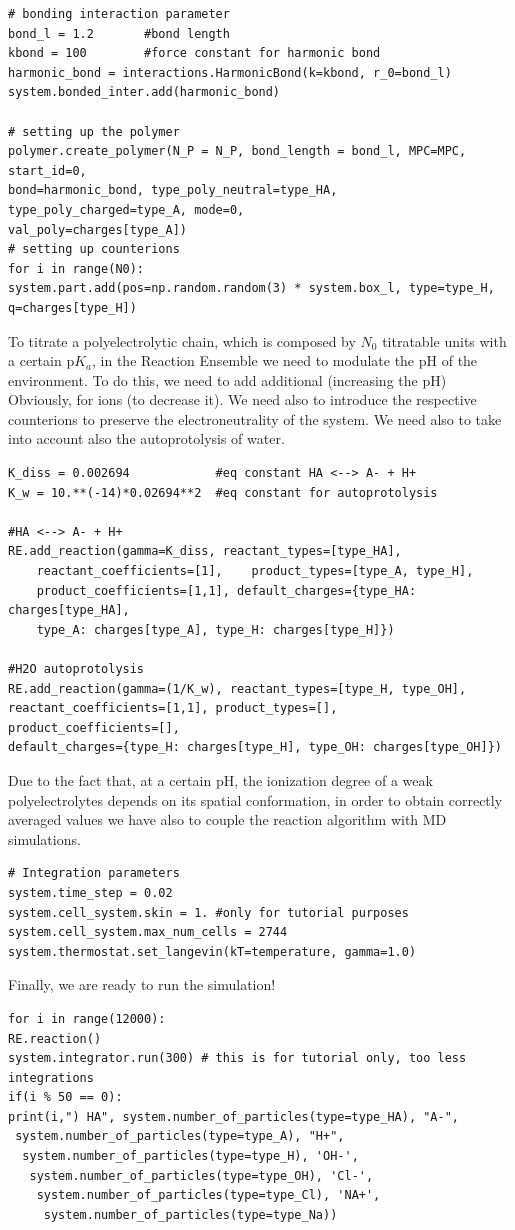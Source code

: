 \documentclass[
a4paper,                        %
11pt,                           %
twoside,                        %
footsepline,                    %
headsepline,                    %
headexclude,                    %
footexclude,                    %
pagesize,                       %
]{scrartcl}
\begin{document}
\begin{verbatim}
# bonding interaction parameter
bond_l = 1.2       #bond length
kbond = 100        #force constant for harmonic bond
harmonic_bond = interactions.HarmonicBond(k=kbond, r_0=bond_l)
system.bonded_inter.add(harmonic_bond)

# setting up the polymer
polymer.create_polymer(N_P = N_P, bond_length = bond_l, MPC=MPC, start_id=0, 
bond=harmonic_bond, type_poly_neutral=type_HA, type_poly_charged=type_A, mode=0,
val_poly=charges[type_A])
# setting up counterions
for i in range(N0):
system.part.add(pos=np.random.random(3) * system.box_l, type=type_H, q=charges[type_H])
\end{verbatim}

To titrate a polyelectrolytic chain, which is composed by $N_0$ titratable units with a certain $\text{p}K_a$, in the Reaction Ensemble we need to modulate the pH of the environment. To do this, we need to add additional  (increasing the pH) Obviously, for  ions (to decrease it). We need also to introduce the respective counterions to preserve the electroneutrality of the system. We need also to take into account also the autoprotolysis of water.

\begin{verbatim}
K_diss = 0.002694            #eq constant HA <--> A- + H+
K_w = 10.**(-14)*0.02694**2  #eq constant for autoprotolysis

#HA <--> A- + H+
RE.add_reaction(gamma=K_diss, reactant_types=[type_HA],
    reactant_coefficients=[1],    product_types=[type_A, type_H], 
    product_coefficients=[1,1], default_charges={type_HA: charges[type_HA], 
    type_A: charges[type_A], type_H: charges[type_H]})

#H2O autoprotolysis 
RE.add_reaction(gamma=(1/K_w), reactant_types=[type_H, type_OH], 
reactant_coefficients=[1,1], product_types=[],    product_coefficients=[],    
default_charges={type_H: charges[type_H], type_OH: charges[type_OH]})
\end{verbatim}

Due to the fact that, at a certain pH, the ionization degree of a weak polyelectrolytes depends on its spatial conformation, in order to obtain  correctly averaged values we have also to couple the reaction algorithm with MD simulations. 

\begin{verbatim}
# Integration parameters
system.time_step = 0.02
system.cell_system.skin = 1. #only for tutorial purposes 
system.cell_system.max_num_cells = 2744
system.thermostat.set_langevin(kT=temperature, gamma=1.0)
\end{verbatim}
Finally, we are ready to run the simulation!
\begin{verbatim}
for i in range(12000):
RE.reaction()
system.integrator.run(300) # this is for tutorial only, too less integrations
if(i % 50 == 0):
print(i,") HA", system.number_of_particles(type=type_HA), "A-",
 system.number_of_particles(type=type_A), "H+",
  system.number_of_particles(type=type_H), 'OH-',
   system.number_of_particles(type=type_OH), 'Cl-',
    system.number_of_particles(type=type_Cl), 'NA+',
     system.number_of_particles(type=type_Na))
\end{verbatim}
\end{document}
